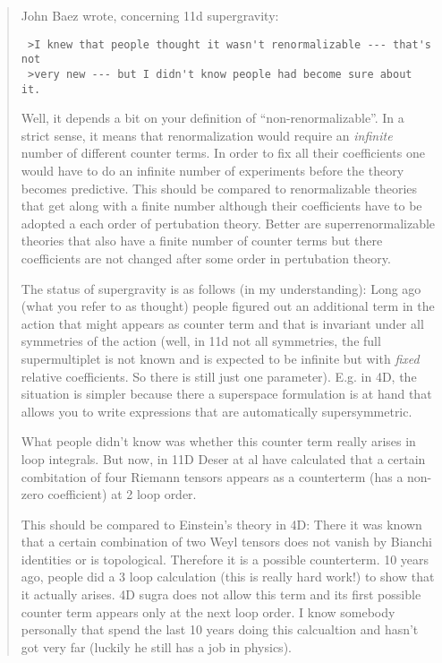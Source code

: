 \documentclass{article}
\begin{document}
\begin{quote}
John Baez wrote, concerning 11d supergravity:

\begin{verbatim}
 >I knew that people thought it wasn't renormalizable --- that's not 
 >very new --- but I didn't know people had become sure about it.
\end{verbatim}

Well, it depends a bit on your definition of ``non-renormalizable''. In
a strict sense, it means that renormalization would require an
\emph{infinite} number of different counter terms. In order to fix all
their coefficients one would have to do an infinite number of
experiments before the theory becomes predictive. This should be
compared to renormalizable theories that get along with a finite number
although their coefficients have to be adopted a each order of
pertubation theory. Better are superrenormalizable theories that also
have a finite number of counter terms but there coefficients are not
changed after some order in pertubation theory.

The status of supergravity is as follows (in my understanding): Long ago
(what you refer to as thought) people figured out an additional term in
the action that might appears as counter term and that is invariant
under all symmetries of the action (well, in 11d not all symmetries, the
full supermultiplet is not known and is expected to be infinite but with
\emph{fixed} relative coefficients. So there is still just one
parameter). E.g. in 4D, the situation is simpler because there a
superspace formulation is at hand that allows you to write expressions
that are automatically supersymmetric.

What people didn't know was whether this counter term really arises in
loop integrals. But now, in 11D Deser at al have calculated that a
certain combitation of four Riemann tensors appears as a counterterm
(has a non-zero coefficient) at 2 loop order.

This should be compared to Einstein's theory in 4D: There it was known
that a certain combination of two Weyl tensors does not vanish by
Bianchi identities or is topological. Therefore it is a possible
counterterm. 10 years ago, people did a 3 loop calculation (this is
really hard work!) to show that it actually arises. 4D sugra does not
allow this term and its first possible counter term appears only at the
next loop order. I know somebody personally that spend the last 10 years
doing this calcualtion and hasn't got very far (luckily he still has a
job in physics).


\end{quote}
\end{document}
